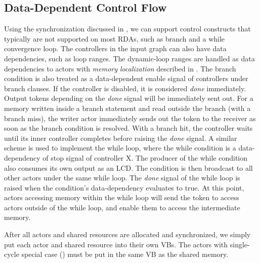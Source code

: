 \subsection{Data-Dependent Control Flow}
Using the synchronization discussed in , we can support control constructs that typically are not supported on most RDAs, such as branch and a while convergence loop.
The controllers in the input graph can also have data dependencies, such as loop ranges. 
The dynamic-loop ranges are handled as data dependencies to actors with \emph{memory localization} described in .
The branch condition is also treated as a data-dependent enable signal of controllers under branch clauses.
If the controller is disabled, it is considered {\em done} immediately.
Output tokens depending on the {\em done} signal will be immediately sent out.
For a memory written inside a branch statement and read outside the branch (with a branch miss), the writer actor immediately sends out the token to the receiver
as soon as the branch condition is resolved. 
With a branch hit, the controller waits until its inner controller completes before raising the {\em done} signal.
A similar scheme is used to implement the while loop, where the while condition is a data-dependency of stop signal of controller X. 
The producer of the while condition also consumes its own output as an LCD. 
The condition is then broadcast to all other actors under the same while loop. 
The {\em done} signal of the while loop is raised when the condition's data-dependency evaluates to true.
At this point, actors accessing memory within the while loop will send the token to access actors outside of the while loop, and enable them to access the intermediate memory.

After all actors and shared resources are allocated and synchronized, we simply put each actor and shared resource into their own VBs.
The actors with single-cycle special case () must be put in the same VB as the shared memory.

